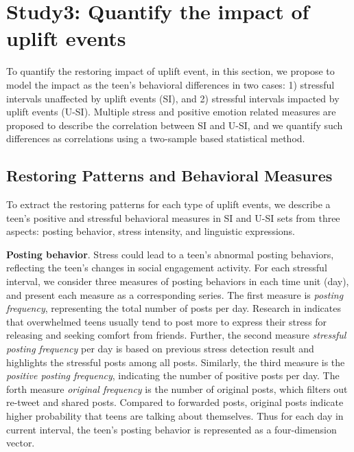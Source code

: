 \section{Study3: Quantify the impact of uplift events}
To quantify the restoring impact of uplift event,
in this section, we propose to model the impact as the teen's behavioral differences in two cases:
1) stressful intervals unaffected by uplift events (SI), and 2) stressful intervals impacted by uplift events (U-SI).
Multiple stress and positive emotion related measures are proposed to describe the correlation between SI and U-SI,
and we quantify such differences as correlations using a two-sample based statistical method.

\subsection{Restoring Patterns and Behavioral Measures}
To extract the restoring patterns  for each type of uplift events,
we describe a teen's positive and stressful behavioral measures in SI and U-SI sets from three aspects:
posting behavior, stress intensity, and linguistic expressions.

\textbf{Posting behavior}.
Stress could lead to a teen's abnormal posting behaviors,
reflecting the teen's changes in social engagement activity.
For each stressful interval,
we consider three measures of posting behaviors in each time unit (day),
and present each measure as a corresponding series.
The first measure is \emph{posting frequency},
representing the total number of posts per day.
Research in \cite{Li2017Analyzing} indicates that overwhelmed teens usually tend to post more to express their stress for releasing
and seeking comfort from friends.
Further, the second measure \emph{stressful posting frequency} per day
is based on previous stress detection result and highlights the stressful posts among all posts.
Similarly, the third measure is the \emph{positive posting frequency}, indicating the number of positive posts per day.
The forth measure \emph{original frequency} is the number of original posts, which filters out re-tweet and shared posts.
Compared to forwarded posts, original posts indicate higher probability that teens are talking about themselves.
Thus for each day in current interval, the teen's posting behavior is represented as a four-dimension vector.

